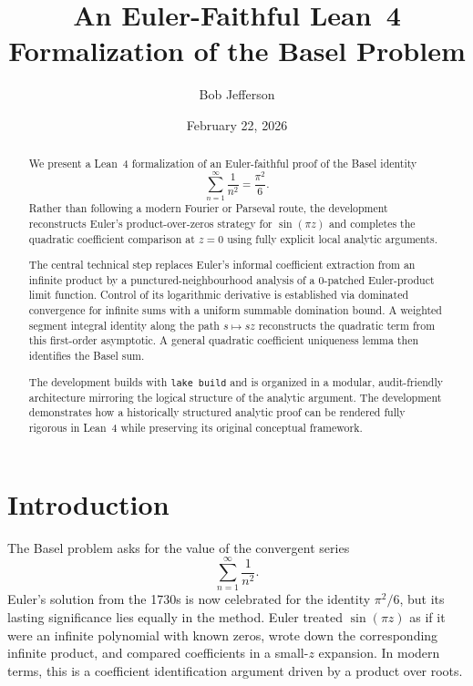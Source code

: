 \documentclass[11pt,a4paper]{article}
\title{An Euler-Faithful Lean~4 Formalization of the Basel Problem}
\author{Bob Jefferson}
\date{February 22, 2026}
\theoremstyle{plain}
\theoremstyle{definition}
\begin{document}
\maketitle

\begin{abstract}
We present a Lean~4 formalization of an Euler-faithful proof of the Basel identity
\[
\sum_{n=1}^{\infty} \frac{1}{n^{2}} = \frac{\pi^{2}}{6}.
\]
Rather than following a modern Fourier or Parseval route, the development reconstructs Euler's product-over-zeros strategy for $\sin(\pi z)$ and completes the quadratic coefficient comparison at $z=0$ using fully explicit local analytic arguments.

The central technical step replaces Euler's informal coefficient extraction from an infinite product by a punctured-neighbourhood analysis of a $0$-patched Euler-product limit function. Control of its logarithmic derivative is established via dominated convergence for infinite sums with a uniform summable domination bound. A weighted segment integral identity along the path $s \mapsto sz$ reconstructs the quadratic term from this first-order asymptotic. A general quadratic coefficient uniqueness lemma then identifies the Basel sum.

The development builds with \texttt{lake build} and is organized in a modular, audit-friendly architecture mirroring the logical structure of the analytic argument. The development demonstrates how a historically structured analytic proof can be rendered fully rigorous in Lean~4 while preserving its original conceptual framework.
\end{abstract}

\clearpage

\begingroup
\hypersetup{hidelinks}
\tableofcontents
\endgroup

\clearpage

\section{Introduction}

The Basel problem asks for the value of the convergent series
\[
\sum_{n=1}^{\infty} \frac{1}{n^{2}}.
\]
Euler's solution from the 1730s is now celebrated for the identity \(\pi^{2}/6\), but its lasting significance lies equally in the method. Euler treated \(\sin(\pi z)\) as if it were an infinite polynomial with known zeros, wrote down the corresponding infinite product, and compared coefficients in a small-\(z\) expansion\cite{EulerE041}. In modern terms, this is a coefficient identification argument driven by a product over roots.
\end{document}
